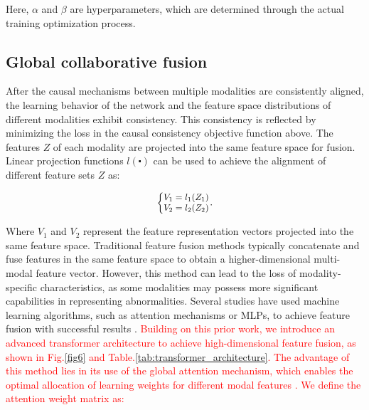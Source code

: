 \documentclass[preprint,12pt]{elsarticle}
\begin{document}
Here, $\alpha$ and $\beta$ are hyperparameters, which are determined through the actual training optimization process.

\subsection{Global collaborative fusion}

After the causal mechanisms between multiple modalities are consistently aligned, the learning behavior of the network and the feature space distributions of different modalities exhibit consistency. This consistency is reflected by minimizing the loss in the causal consistency objective function above. The features $Z$ of each modality are projected into the same feature space for fusion. Linear projection functions $l(\centerdot )$ can be used to achieve the alignment of different feature sets $Z$ as:

\begin{equation}
  \scalebox{0.9}{$
  \left\{ \begin{matrix}
    {{V}_{1}}={{l}_{1}}({{Z}_{1}})  \\
    {{V}_{2}}={{l}_{2}}({{Z}_{2}})  \\
 \end{matrix} \right.
 $}.
  \label{eq11}
\end{equation}

Where ${{V}_{1}}$ and ${{V}_{2}}$ represent the feature representation vectors projected into the same feature space. Traditional feature fusion methods typically concatenate and fuse features in the same feature space to obtain a higher-dimensional multi-modal feature vector. However, this method can lead to the loss of modality-specific characteristics, as some modalities may possess more significant capabilities in representing abnormalities. Several studies have used machine learning algorithms, such as attention mechanisms or MLPs, to achieve feature fusion with successful results \cite{RN334, RN335}. \textcolor{red}{Building on this prior work, we introduce an advanced transformer architecture to achieve high-dimensional feature fusion, as shown in Fig.\ref{fig6} and Table.\ref{tab:transformer_architecture}. The advantage of this method lies in its use of the global attention mechanism, which enables the optimal allocation of learning weights for different modal features \cite{RN348}. We define the attention weight matrix as:}
\end{document}
